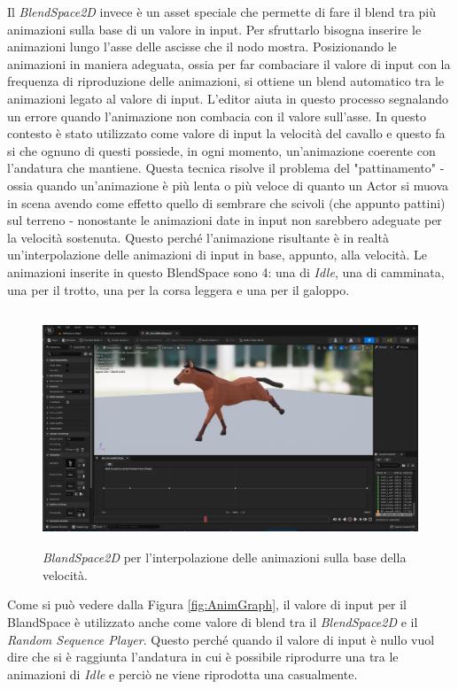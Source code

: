     Il \textit{BlendSpace2D} invece è un asset speciale che permette di fare il blend tra più animazioni sulla base di un valore in input.
    Per sfruttarlo bisogna inserire le animazioni lungo l'asse delle ascisse che il nodo mostra.
    Posizionando le animazioni in maniera adeguata, ossia per far combaciare il valore di input con la frequenza di riproduzione delle animazioni, si ottiene un blend automatico tra le animazioni legato al valore di input.
    L'editor aiuta in questo processo segnalando un errore quando l'animazione non combacia con il valore sull'asse.
    In questo contesto è stato utilizzato come valore di input la velocità del cavallo e questo fa si che ognuno di questi possiede, in ogni momento, un'animazione coerente con l'andatura che mantiene.
    Questa tecnica risolve il problema del "pattinamento" - ossia quando un'animazione è più lenta o più veloce di quanto un Actor si muova in scena avendo come effetto quello di sembrare che scivoli (che appunto pattini) sul terreno - nonostante le animazioni date in input non sarebbero adeguate per la velocità sostenuta.
    Questo perché l'animazione risultante è in realtà un'interpolazione delle animazioni di input in base, appunto, alla velocità.
    Le animazioni inserite in questo BlendSpace sono 4: una di \textit{Idle}, una di camminata, una per il trotto, una per la corsa leggera e una per il galoppo.

    \begin{figure}[!ht]
        \centering
        \includegraphics[height=7cm]{figure/HorseBlendSpaceGalop.JPG}
        \caption{\textit{BlandSpace2D} per l'interpolazione delle animazioni sulla base della velocità.}
    \end{figure}

    Come si può vedere dalla Figura \ref{fig:AnimGraph}, il valore di input per il BlandSpace è utilizzato anche come valore di blend tra il \textit{BlendSpace2D} e il \textit{Random Sequence Player}.
    Questo perché quando il valore di input è nullo vuol dire che si è raggiunta l'andatura in cui è possibile riprodurre una tra le animazioni di \textit{Idle} e perciò ne viene riprodotta una casualmente. 


